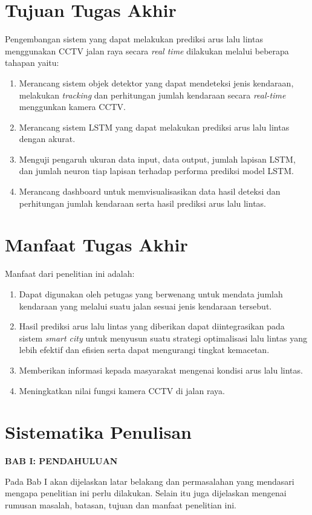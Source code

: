 \documentclass[../thesis.tex]{subfiles}
\begin{document}
\section{Tujuan Tugas Akhir}
Pengembangan sistem yang dapat melakukan prediksi arus lalu lintas menggunakan CCTV jalan raya secara \textit{real time} dilakukan melalui beberapa tahapan yaitu:
\begin{enumerate}
    \item Merancang sistem objek detektor yang dapat mendeteksi jenis kendaraan, melakukan \textit{tracking} dan perhitungan jumlah kendaraan secara \textit{real-time} menggunkan kamera CCTV.
    \item Merancang sistem LSTM yang dapat melakukan prediksi arus lalu lintas dengan akurat.
    \item Menguji pengaruh ukuran data input, data output, jumlah lapisan LSTM, dan jumlah neuron tiap lapisan terhadap performa prediksi model LSTM.
    \item Merancang dashboard untuk memvisualisasikan data hasil deteksi dan perhitungan jumlah kendaraan serta hasil prediksi arus lalu lintas.
\end{enumerate}

\section{Manfaat Tugas Akhir}
Manfaat dari penelitian ini adalah:
\begin{enumerate}
\item Dapat digunakan oleh petugas yang berwenang untuk mendata jumlah kendaraan yang melalui suatu jalan sesuai jenis kendaraan tersebut.
\item Hasil prediksi arus lalu lintas yang diberikan dapat diintegrasikan pada sistem \textit{smart city} untuk menyusun suatu strategi optimalisasi lalu lintas yang lebih efektif dan efisien serta dapat mengurangi tingkat kemacetan.
\item Memberikan informasi kepada masyarakat mengenai kondisi arus lalu lintas.
\item Meningkatkan nilai fungsi kamera CCTV di jalan raya.
\end{enumerate}

\section{Sistematika Penulisan}
\begin{flushleft}
    \textbf{BAB I: PENDAHULUAN} 
\end{flushleft}
\par
Pada Bab I akan dijelaskan latar belakang dan permasalahan yang mendasari mengapa
penelitian ini perlu dilakukan. Selain itu juga dijelaskan mengenai rumusan masalah, batasan,
tujuan dan manfaat penelitian ini.
\end{document}
